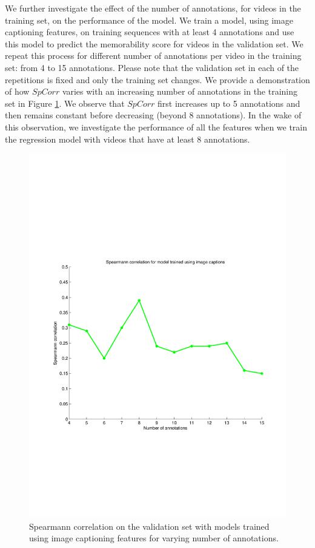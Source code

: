 \documentclass[sigconf]{acmart}
\begin{document}
We further investigate the effect of the number of annotations, for videos in the training set, on the performance of the model.
We train a model, using image captioning features, on training sequences with at least 4 annotations and use this model to predict the memorability score for videos in the validation set.
We repeat this process for different number of annotations per video in the training set: from 4 to 15 annotations.
Please note that the validation set in each of the repetitions is fixed and only the training set changes.
We provide a demonstration of how $SpCorr$ varies with an increasing number of annotations in the training set in Figure \ref{num-ann}.
We observe that $SpCorr$ first increases up to 5 annotations and then remains constant before decreasing (beyond 8 annotations).
In the wake of this observation, we investigate the performance of all the features when we train the regression model with videos that have at least 8 annotations.

\begin{figure}[h]	  
  \centering
    \includegraphics[width=0.7\columnwidth]{figures/annotations.pdf}
		\caption{Spearmann correlation on the validation set with models trained using image captioning features for varying number of annotations.}
    \label{num-ann}
\end{figure}
\end{document}
